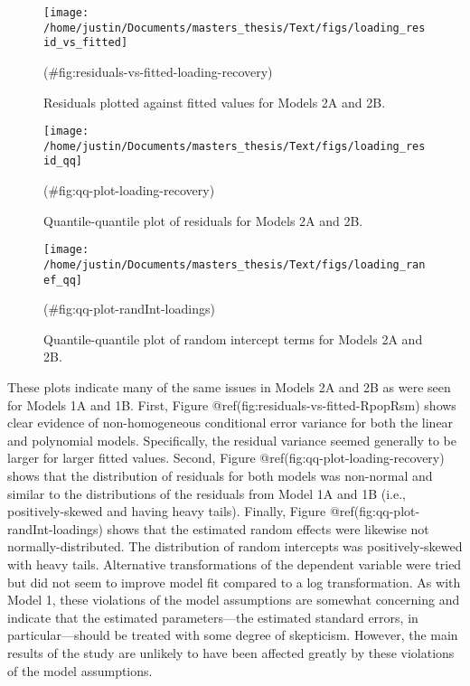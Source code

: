 \begin{appendix}
\begin{figure}
{\centering \texttt{[image: /home/justin/Documents/masters\_thesis/Text/figs/loading\_resid\_vs\_fitted]} 

}

\caption{Residuals plotted against fitted values for Models 2A and 2B.}(\#fig:residuals-vs-fitted-loading-recovery)
\end{figure}

\begin{figure}

{\centering \texttt{[image: /home/justin/Documents/masters\_thesis/Text/figs/loading\_resid\_qq]} 

}

\caption{Quantile-quantile plot of residuals for Models 2A and 2B.}(\#fig:qq-plot-loading-recovery)
\end{figure}

\begin{figure}

{\centering \texttt{[image: /home/justin/Documents/masters\_thesis/Text/figs/loading\_ranef\_qq]} 

}

\caption{Quantile-quantile plot of random intercept terms for Models 2A and 2B.}(\#fig:qq-plot-randInt-loadings)
\end{figure}

These plots indicate many of the same issues in Models 2A and 2B as were
seen for Models 1A and 1B. First, Figure
@ref(fig:residuals-vs-fitted-RpopRsm) shows clear evidence of
non-homogeneous conditional error variance for both the linear and
polynomial models. Specifically, the residual variance seemed generally
to be larger for larger fitted values. Second, Figure
@ref(fig:qq-plot-loading-recovery) shows that the distribution of
residuals for both models was non-normal and similar to the
distributions of the residuals from Model 1A and 1B (i.e.,
positively-skewed and having heavy tails). Finally, Figure
@ref(fig:qq-plot-randInt-loadings) shows that the estimated random
effects were likewise not normally-distributed. The distribution of
random intercepts was positively-skewed with heavy tails. Alternative
transformations of the dependent variable were tried but did not seem to
improve model fit compared to a log transformation. As with Model 1,
these violations of the model assumptions are somewhat concerning and
indicate that the estimated parameters---the estimated standard errors,
in particular---should be treated with some degree of skepticism.
However, the main results of the study are unlikely to have been
affected greatly by these violations of the model assumptions.
\end{appendix}
